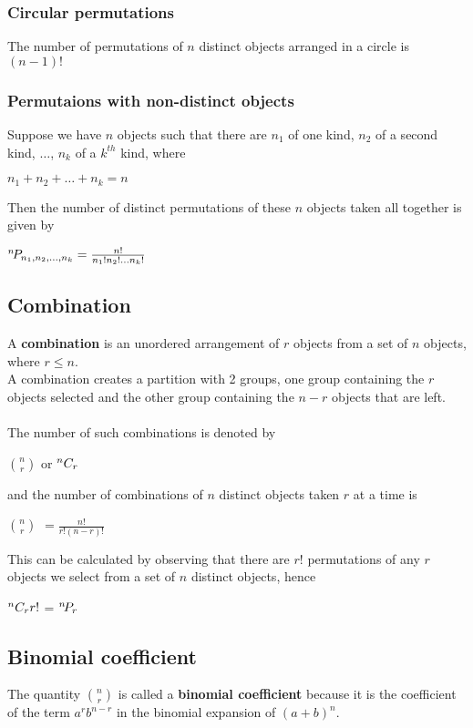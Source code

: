 \documentclass[a4paper]{article}
\begin{document}
\subsubsection{Circular permutations}
The number of permutations of $n$ distinct objects arranged in a circle is $(n-1)!$
\subsubsection{Permutaions with non-distinct objects}
Suppose we have $n$ objects such that there are $n_1$ of one kind, $n_2$ of a second kind, $\dots$, $n_k$ of a $k^{th}$ kind, where 
\begin{center}
	$n_1+n_2+\dots +n_k = n$
\end{center} 
Then the number of distinct permutations of these $n$ objects taken all together is given by 
\begin{center}
	${}^{n}\!P_{n_1,n_2,\dots,n_k} = \frac{n!}{n_1!n_2!\dots n_k!}$
\end{center}
\subsection{Combination}
A \textbf{combination} is an unordered arrangement  of $r$ objects from a set of $n$ objects, where $r \le n$.\\
A combination creates a partition with 2 groups, one group containing the $r$ objects selected and the other group containing the $n-r$ objects that are left.\\ \\
The number of such combinations is denoted by 
\begin{center}
	$n\choose r$ or ${}^{n}C_{r}$
\end{center}
and the number of combinations of $n$ distinct objects taken $r$ at a time is
\begin{center}
	${n}\choose{r}$ $= \frac{n!}{r!(n-r)!}$
\end{center}
This can be calculated by observing that there are $r!$ permutations of any $r$ objects we select from a set of $n$ distinct objects, hence
\begin{center}
	${}^{n}C_{r} r!$ = ${}^{n}\!P_{r}$
\end{center}
\subsection{Binomial coefficient}
The quantity $n\choose r$ is called a \textbf{binomial coefficient} because it is the coefficient of the term $a^rb^{n-r}$ in the binomial expansion of $(a+b)^n$.
\end{document}
